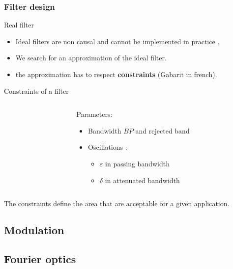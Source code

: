   \frametitle{Filter design}
  
  \begin{block}{Real filter}
    \begin{itemize}
    \item Ideal filters are non causal and cannot be implemented in practice .
    \item We search for an approximation of the ideal filter.
    \item the approximation has to respect \textbf{constraints} (Gabarit in french).
    \end{itemize}
  \end{block}


  \begin{block}{Constraints of a filter}

\begin{columns}[T]
  \begin{column}%
       \begin{center}
\end{center}
  \end{column}%
  \begin{column}%
    \begin{block}{Parameters:}
      \begin{itemize}
      \item Bandwidth $BP$ and rejected band
      \item Oscillations :
        \begin{itemize}
        \item $\varepsilon$ in passing bandwidth
        \item $\delta$ in attenuated bandwidth
        \end{itemize}
      \end{itemize}\vspace{7mm}
    \end{block}

  \end{column}
\end{columns}
 The constraints define the area that are acceptable for a given application.
  \end{block}

\subsection{Modulation}
\label{sec:modulation}

\subsection{Fourier optics}
\label{sec:}